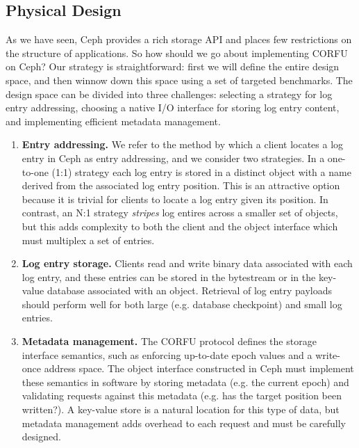\documentclass[10pt,twocolumn]{article}
\begin{document}
\subsection{Physical Design}

As we have seen, Ceph provides a rich storage API and places few restrictions
on the structure of applications. So how should we go about implementing CORFU
on Ceph? Our strategy is straightforward: first we will define the entire
design space, and then winnow down this space using a set of targeted
benchmarks. The design space can be divided into three challenges:
selecting a strategy for log entry addressing, choosing a native I/O interface
for storing log entry content, and implementing efficient metadata management.

\begin{enumerate}
    \item {\bf Entry addressing.} We refer to the method by which a client
        locates a log entry in Ceph as entry addressing, and we consider two
        strategies. In a one-to-one (1:1) strategy each log entry is stored in
        a distinct object with a name derived from the associated log entry
        position. This is an attractive option because it is trivial for
        clients to locate a log entry given its position.  In contrast, an N:1
        strategy \emph{stripes} log entires across a smaller set of objects,
        but this adds complexity to both the client and the object interface which
        must multiplex a set of entries.

    \item {\bf Log entry storage.} Clients read and write binary data
        associated with each log entry, and these entries can be stored in the
        bytestream or in the key-value database associated with an object.
        Retrieval of log entry payloads should perform well for both large
        (e.g. database checkpoint) and small log entries.

    \item {\bf Metadata management.} The CORFU protocol defines the storage
        interface semantics, such as enforcing up-to-date epoch values and a
        write-once address space. The object interface constructed in Ceph must
        implement these semantics in software by storing metadata (e.g. the
        current epoch) and validating requests against this metadata (e.g. has
        the target position been written?). A key-value store is a natural
        location for this type of data, but metadata management adds overhead
        to each request and must be carefully designed.
\end{enumerate}
\end{document}
